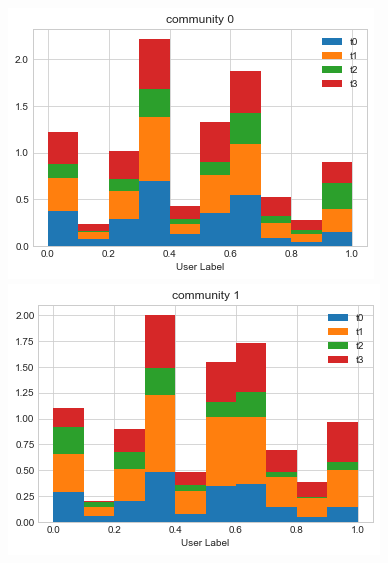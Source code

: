 \documentclass[sigchi]{acmart}
\begin{document}
\begin{figure}[h]
\centering

\begin{minipage}[b]{.48\linewidth}
\centering\large \includegraphics[width=0.9\linewidth]{report/img/community_distribution_0.png}
\end{minipage}%
\begin{minipage}[b]{.48\linewidth}
\centering\includegraphics[width=0.9\linewidth]{report/img/community_distribution_1.png}
\end{minipage}


\end{figure}
\end{document}
